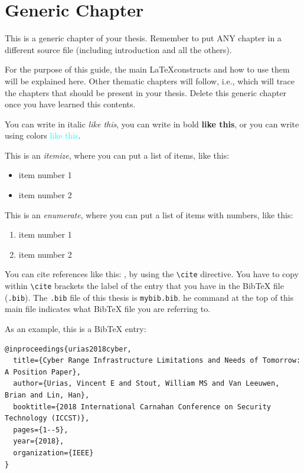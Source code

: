 \chapter{Generic Chapter}
This is a generic chapter of your thesis. Remember to put ANY chapter in a different source file (including introduction and all the others). 

For the purpose of this guide, the main \LaTeX constructs and how to use them will be explained here. Other thematic chapters will follow, i.e., which will trace the chapters that should be present in your thesis. Delete this generic chapter once you have learned this contents.

You can write in italic \emph{like this}, you can write in bold \textbf{like this}, or you can write using colors \textcolor{cyan}{like this}.

This is an \emph{itemize}, where you can put a list of items, like this:
\begin{itemize}
\item item number 1
\item item number 2
\end{itemize} 

This is an \emph{enumerate}, where you can put a list of items with numbers, like this:
\begin{enumerate}
\item item number 1
\item item number 2
\end{enumerate} 

You can cite references like this: \cite{lee2016introduction} \cite{jiang2013towards}, by using the \lstinline{\cite} directive. You have to copy within \lstinline{\cite} brackets the label of the entry that you have in the BibTeX file (\texttt{.bib}). The \texttt{.bib} file of this thesis is \texttt{mybib.bib}. he command \lstinline{} at the top of this main file indicates what BibTeX file you are referring to. 

As an example, this is a BibTeX entry:

\begin{verbatim}
@inproceedings{urias2018cyber,
  title={Cyber Range Infrastructure Limitations and Needs of Tomorrow: A Position Paper},
  author={Urias, Vincent E and Stout, William MS and Van Leeuwen, Brian and Lin, Han},
  booktitle={2018 International Carnahan Conference on Security Technology (ICCST)},
  pages={1--5},
  year={2018},
  organization={IEEE}
}
\end{verbatim}

